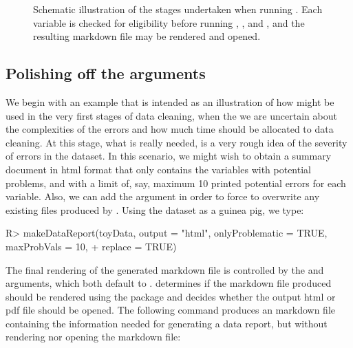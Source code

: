 \documentclass[article,shortnames]{jss}
\begin{document}
\begin{figure}[tb]
\caption{Schematic illustration of the stages undertaken when running
  . Each variable is checked for eligibility before
  running , , and , and the
  resulting  markdown file may be rendered and opened.}
\label{figure:cleanStructure}
\end{figure}





\subsection{Polishing off the arguments}
We begin with an example that is intended as an illustration of how
 might be used in the very first stages of data
cleaning, when the we are uncertain about the complexities of the
errors and how much time should be allocated to data cleaning. At
this stage, what is really needed, is a very rough idea of the
severity of errors in the dataset. In this scenario, we might wish to
obtain a summary document in html format that only contains the
variables with potential problems, and with a limit of, say, maximum
10 printed potential errors for each variable. Also, we can add the
argument  in order to force  to
overwrite any existing files produced by .  Using the
 dataset as a guinea pig, we type:

\begin{Schunk}
\begin{Sinput}
R> makeDataReport(toyData, output = "html", onlyProblematic = TRUE, maxProbVals = 10,
+    replace = TRUE)
\end{Sinput}
\end{Schunk}

The final rendering of the generated markdown file is controlled by
the  and  arguments, which both default to
.  determines if the  markdown file
produced should be rendered using the  \citep{rmarkdown} package and
 decides whether the output html or pdf file should be
opened. The following command produces an  markdown file
containing the information needed for generating a data report, but without
rendering nor opening the markdown file:
\end{document}
